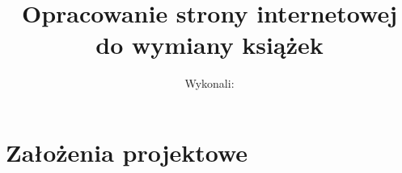 \documentclass[12pt]{article}
\author{Wykonali:}
\title{Opracowanie strony internetowej do wymiany książek}
\begin{document}
\maketitle


\tableofcontents

\clearpage




\section{Założenia projektowe}
\end{document}
